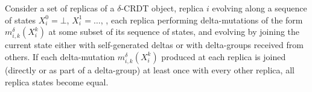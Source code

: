 \begin{theorem}
  Consider a set of replicas of a $\delta$-CRDT object, replica $i$ evolving
  along a sequence of states $X_i^0 = \bot$, $X_i^1=\ldots$, , each replica
  performing delta-mutations of the form $m^\delta_{i,k}(X^k_i)$ at some subset
  of its sequence of states, and evolving by joining the current state either
  with self-generated deltas or with delta-groups received from others. If each
  delta-mutation $m^\delta _{i,k}(X^k_i)$ produced at each replica is joined
  (directly or as part of a delta-group) at least once with every other replica,
  all replica states become equal.
\end{theorem}
